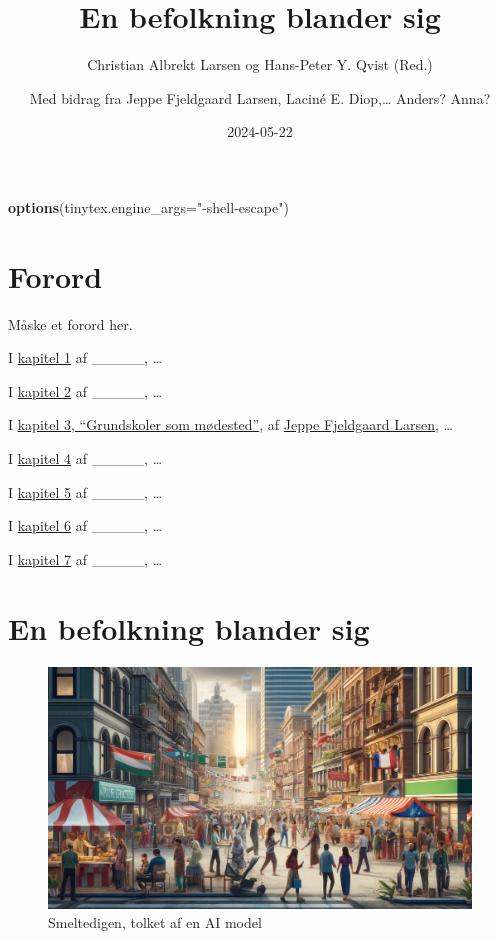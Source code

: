 \documentclass[
]{book}
\title{En befolkning blander sig}
\author{Christian Albrekt Larsen og Hans-Peter Y. Qvist (Red.) \and Med bidrag fra Jeppe Fjeldgaard Larsen, Laciné E. Diop,\ldots{} Anders? Anna?}
\date{2024-05-22}
\newenvironment{Shaded}{\begin{snugshade}}{\end{snugshade}}
\newcommand{\AttributeTok}[1]{\textcolor[rgb]{0.13,0.29,0.53}{#1}}
\newcommand{\FunctionTok}[1]{\textcolor[rgb]{0.13,0.29,0.53}{\textbf{#1}}}
\newcommand{\NormalTok}[1]{#1}
\newcommand{\StringTok}[1]{\textcolor[rgb]{0.31,0.60,0.02}{#1}}
\begin{document}
\maketitle

{
\setcounter{tocdepth}{1}
\tableofcontents
}
\begin{Shaded}
\begin{Highlighting}[]
\FunctionTok{options}\NormalTok{(}\AttributeTok{tinytex.engine\_args=}\StringTok{"{-}shell{-}escape"}\NormalTok{)}
\end{Highlighting}
\end{Shaded}

\chapter*{Forord}\label{forord}

Måske et forord her.

I \hyperref[kap1]{kapitel 1} af \_\_\_\_\_, \ldots{}

I \hyperref[kap2]{kapitel 2} af \_\_\_\_\_, \ldots{}

I \hyperref[kap3]{kapitel 3, ``Grundskoler som mødested''}, af \href{https://vbn.aau.dk/da/persons/140717}{Jeppe Fjeldgaard Larsen}, \ldots{}

I \hyperref[kap4]{kapitel 4} af \_\_\_\_\_, \ldots{}

I \hyperref[kap5]{kapitel 5} af \_\_\_\_\_, \ldots{}

I \hyperref[kap6]{kapitel 6} af \_\_\_\_\_, \ldots{}

I \hyperref[kap7]{kapitel 7} af \_\_\_\_\_, \ldots{}

\chapter{En befolkning blander sig}\label{kap1}

\begin{figure}
\includegraphics[width=1\linewidth]{images/dalle-smeltedige} \caption{Smeltedigen, tolket af en AI model}\label{fig:fig-smelte}
\end{figure}
\end{document}

